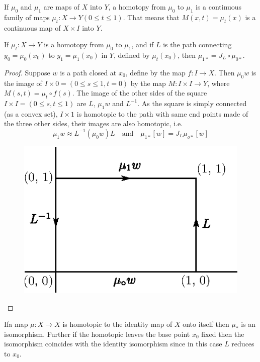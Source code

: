 If $\mu_0$ and $\mu_1$ are maps of $X$ into $Y$, a homotopy from
$\mu_0$ to $\mu_1$ is a continuous family of maps $\mu_t:X \to Y(0
\leq t \leq 1)$. That means that $M(x,t)=\mu_t (x)$ is a continuous
map of $X \times I$ into $Y$.  

\begin{theorem}\label{thm1.1}%
If $\mu_t: X \to Y$ is a homotopy from $\mu_0$ to $\mu_1$, and if
  $L$ is the path connecting $y_0=\mu_0 (x_0)$ to $y_1=\mu_1(x_0)$ in
  $Y$, defined by $\mu_t (x_0)$, then $\mu_{1\ast}=J_L\circ \mu_{0\ast}$. 
\end{theorem}

\begin{proof}
Suppose $w$ is a path closed at $x_0$, define by the map $f: I \to
X$. Then $\mu_0 w$ is the image of $I \times 0=(0 \leq s \leq 1,t=0)$
by the map $M: I \times I \to Y$, where $M(s,t)=\mu_t\circ f(s)$. The
image of the other sides of the square $I \times I=(0 \leq s,t \leq
1)$ are $L$, $\mu_1 w$ and $L^{-1}$. As the square is simply connected
(as a convex set), $I \times 1$ is homotopic to the path with same end
points made of the three other sides, their images are also homotopic,
i.e. 
$$
\mu_1 w \approx L^{-1} (\mu_0 w) L \quad \text{and} \quad  \mu_{1\ast}
   [w] = J_L \mu_{o\ast} [w]  
$$
\begin{figure}[H]
\centering
\includegraphics{vol44-fig/fig44-1.eps}
\end{figure}
\end{proof}

\begin{corollary}\label{cor1}%
If\pageoriginale a map $\mu :X \to X$ is homotopic to the identity map
of $X$ onto 
itself then $\mu_*$ is an isomorphism. Further if the homotopic leaves
the base point $x_0$ fixed then the isomorphism coincides with the
identity isomorphism since in this case $L$ reduces to $x_0$. 
\end{corollary}

